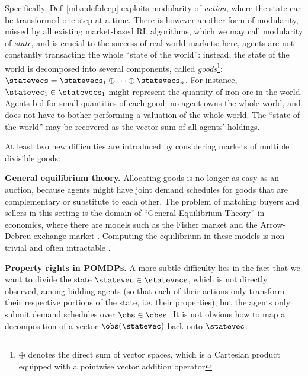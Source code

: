 Specifically, Def~\ref{mba:def:deep} exploits modularity of \emph{action}, where the state can be transformed one step at a time. There is however another form of modularity, missed by all existing market-based RL algorithms, which we may call modularity of \emph{state}, and is crucial to the success of real-world markets:  here, agents are not constantly transacting the whole ``state of the world'': instead, the state of the world is decomposed into several components, called \emph{goods}\footnote{$\oplus$ denotes the direct sum of vector spaces, which is a Cartesian product equipped with a pointwise vector addition operator}: $\statevecs=\statevecs_1\oplus\dots\oplus\statevecs_n$. For instance, $\statevec_1\in\statevecs_1$ might represent the quantity of iron ore in the world. Agents bid for small quantities of each good; no agent owns the whole world, and does not have to bother performing a valuation of the whole world. The ``state of the world'' may be recovered as the vector sum of all agents' holdings.%

At least two new difficulties are introduced by considering markets of multiple divisible goods:

\textbf{General equilibrium theory.} Allocating goods is no longer as easy as an auction, because agents might have joint demand schedules for goods that are complementary or substitute to each other. The problem of matching buyers and sellers in this setting is the domain of ``General Equilibrium Theory'' in economics, where there are models such as the Fisher market and the Arrow-Debreu exchange market \citep{arrowExistenceEquilibriumCompetitive1954, mckenzieExistenceGeneralEquilibrium1959}. Computing the equilibrium in these models is non-trivial and often intractable \citep{chenSettlingComplexityArrowDebreu2009, chenSpendingNotEasier2009a}.

\textbf{Property rights in POMDPs.} A more subtle difficulty lies in the fact that we want to divide the state $\statevec\in\statevecs$, which is not directly observed, among bidding agents (so that each of their actions only transform their respective portions of the state, i.e. their properties), but the agents only submit demand schedules over $\obs\in\obss$. It is not obvious how to map a decomposition of a vector $\obs(\statevec)$ back onto $\statevec$.

